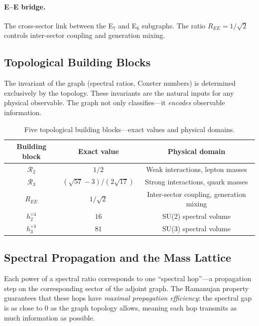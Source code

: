 \paragraph{E--E bridge.} The cross-sector link between the E$_7$ and E$_6$ subgraphs. The ratio $R_{EE} = 1/\sqrt{2}$ controls inter-sector coupling and generation mixing.

\subsection{Topological Building Blocks}\label{sec:topological_blocks}

The invariant of the graph (spectral ratios, Coxeter numbers) is determined exclusively by the topology. These invariants are the natural inputs for any physical observable. The graph not only classifies---it \emph{encodes} observable information.

\begin{table}[h]
\centering
\begin{tabular}{c c c}
\hline\hline
Building block & Exact value & Physical domain \\
\hline
$\mathcal{R}_2$ & $1/2$ & Weak interactions, lepton masses \\
$\mathcal{R}_3$ & $(\sqrt{57}-3)/(2\sqrt{17})$ & Strong interactions, quark masses \\
$R_{EE}$ & $1/\sqrt{2}$ & Inter-sector coupling, generation mixing \\
$h_2^{\vee 4}$ & $16$ & SU(2) spectral volume \\
$h_3^{\vee 4}$ & $81$ & SU(3) spectral volume \\
\hline\hline
\end{tabular}
\caption{Five topological building blocks---exact values and physical domains.}
\end{table}

\subsection{Spectral Propagation and the Mass Lattice}\label{sec:mass_lattice}

Each power of a spectral ratio corresponds to one ``spectral hop''---a propagation step on the corresponding sector of the adjoint graph. The Ramanujan property guarantees that these hops have \emph{maximal propagation efficiency}: the spectral gap is as close to 0 as the graph topology allows, meaning each hop transmits as much information as possible.

